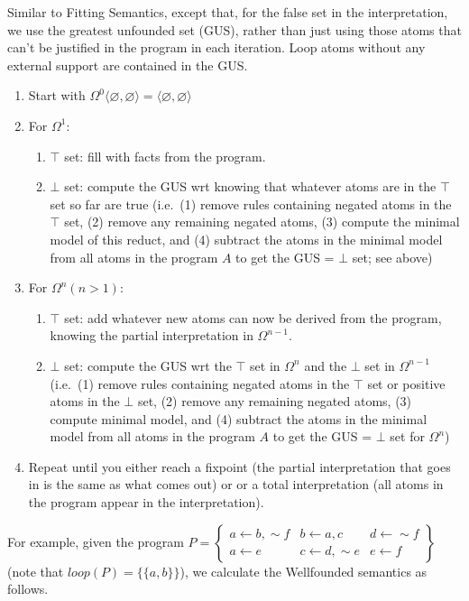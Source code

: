 \documentclass[9pt,a4paper,landscape]{article}
\begin{document}
{Similar to Fitting Semantics, except that, for the false set in the interpretation, we use the greatest unfounded set (GUS), rather than just using those atoms that can't be justified in the program in each iteration.
Loop atoms without any external support are contained in the GUS.

\begin{enumerate}[noitemsep]
	\item Start with $\Omega^0 \langle \varnothing, \varnothing \rangle = \langle \varnothing, \varnothing \rangle$
	\item For $\Omega^1$:
	\begin{enumerate}[noitemsep]
		\item $\top$ set: fill with facts from the program.
		\item $\bot$ set: compute the GUS wrt knowing that whatever atoms are in the $\top$ set so far are true (i.e.\ (1) remove rules containing negated atoms in the $\top$ set, (2) remove any remaining negated atoms, (3) compute the minimal model of this reduct, and (4) subtract the atoms in the minimal model from all atoms in the program $A$ to get the GUS = $\bot$ set; see above)
	\end{enumerate}
	\item For $\Omega^n (n>1)$:
	\begin{enumerate}[noitemsep]
		\item $\top$ set: add whatever new atoms can now be derived from the program, knowing the partial interpretation in $\Omega^{n-1}$.
		\item $\bot$ set: compute the GUS wrt the $\top$ set in $\Omega^n$ and the $\bot$ set in $\Omega^{n-1}$ (i.e.\ (1) remove rules containing negated atoms in the $\top$ set or positive atoms in the $\bot$ set, (2) remove any remaining negated atoms, (3) compute minimal model, and (4) subtract the atoms in the minimal model from all atoms in the program $A$ to get the GUS = $\bot$ set for  $\Omega^{n}$)
	\end{enumerate}	
	\item Repeat until you either reach a fixpoint (the partial interpretation that goes in is the same as what comes out) or or a total interpretation (all atoms in the program appear in the interpretation).
\end{enumerate}

\pagebreak

For example, given the program $P = \left\{\begin{array}{lll}
a \leftarrow b, {\sim} f & b \leftarrow a, c & d \leftarrow {\sim} f\\
a \leftarrow e & c \leftarrow d, {\sim} e & e \leftarrow f
\end{array}\right\}$ (note that $loop(P) = \{ \{a, b \} \}$), we calculate the Wellfounded semantics as follows.

}
\end{document}
